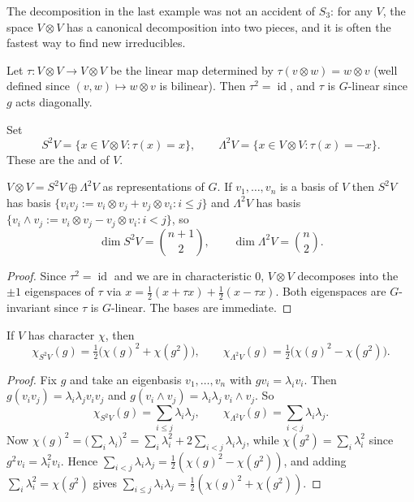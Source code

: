 \documentclass[a4paper]{scrartcl}
\newcommand{\id}{\operatorname{id}}
\begin{document}
The decomposition in the last example was not an accident of $S_3$: for any $V$, the space $V\otimes V$ has a canonical decomposition into two pieces, and it is often the fastest way to find new irreducibles.

Let $\tau : V\otimes V \to V\otimes V$ be the linear map determined by $\tau(v\otimes w) = w\otimes v$ (well defined since $(v,w)\mapsto w\otimes v$ is bilinear). Then $\tau^2 = \id$, and $\tau$ is $G$-linear since $g$ acts diagonally.

\begin{definition}
	Set
	$$S^2V = \{x \in V\otimes V : \tau(x) = x\}, \qquad \Lambda^2V = \{x\in V\otimes V: \tau(x) = -x\}.$$
	These are the  and  of $V$.
\end{definition}

\begin{proposition}
	$V \otimes V = S^2V\oplus\Lambda^2V$ as representations of $G$. If $v_1,\dots,v_n$ is a basis of $V$ then $S^2V$ has basis $\{v_iv_j := v_i\otimes v_j + v_j\otimes v_i : i\leq j\}$ and $\Lambda^2V$ has basis $\{v_i\wedge v_j := v_i\otimes v_j - v_j\otimes v_i : i<j\}$, so
	$$\dim S^2 V = \binom{n+1}2, \qquad \dim\Lambda^2V = \binom n2.$$
\end{proposition}
\begin{proof}
	Since $\tau^2 = \id$ and we are in characteristic $0$, $V\otimes V$ decomposes into the $\pm1$ eigenspaces of $\tau$ via $x = \frac12(x+\tau x) + \frac12(x - \tau x)$. Both eigenspaces are $G$-invariant since $\tau$ is $G$-linear. The bases are immediate.
\end{proof}

\begin{proposition}
	If $V$ has character $\chi$, then
	$$\chi_{S^2V}(g) = \tfrac12\big(\chi(g)^2 + \chi(g^2)\big), \qquad \chi_{\Lambda^2V}(g) = \tfrac12\big(\chi(g)^2 - \chi(g^2)\big).$$
\end{proposition}
\begin{proof}
	Fix $g$ and take an eigenbasis $v_1,\dots,v_n$ with $gv_i = \lambda_i v_i$. Then $g(v_iv_j) = \lambda_i\lambda_j v_iv_j$ and $g(v_i\wedge v_j) = \lambda_i\lambda_j\, v_i\wedge v_j$. So
	$$\chi_{S^2V}(g) = \sum_{i\leq j}\lambda_i\lambda_j, \qquad \chi_{\Lambda^2V}(g) = \sum_{i<j}\lambda_i\lambda_j.$$
	Now $\chi(g)^2 = \big(\sum_i\lambda_i\big)^2 = \sum_i\lambda_i^2 + 2\sum_{i<j}\lambda_i\lambda_j$, while $\chi(g^2) = \sum_i\lambda_i^2$ since $g^2 v_i = \lambda_i^2v_i$. Hence $\sum_{i<j}\lambda_i\lambda_j = \frac12(\chi(g)^2 - \chi(g^2))$, and adding $\sum_i\lambda_i^2 = \chi(g^2)$ gives $\sum_{i\leq j}\lambda_i\lambda_j = \frac12(\chi(g)^2+\chi(g^2))$.
\end{proof}
\end{document}
